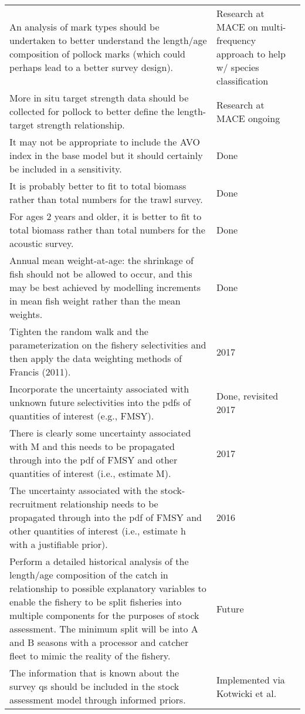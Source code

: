 \documentclass[]{article}
\begin{document}
\begin{table}[ht]
\begin{tabular}{p{4.0in}p{2.5in}}
An analysis of mark types should be undertaken to better understand the length/age composition of pollock marks (which could perhaps lead to a better survey design).   &   Research at MACE on multi-frequency approach to help w/ species classification \\
More in situ target strength data should be collected for pollock to better define the length-target strength relationship. &   Research at MACE ongoing \\
It may not be appropriate to include the AVO index in the base model but it should certainly be included in a sensitivity.  &   Done \\
It is probably better to fit to total biomass rather than total numbers for the trawl survey.   &   Done \\
For ages 2 years and older, it is better to fit to total biomass rather than total numbers for the acoustic survey. &   Done \\
Annual mean weight-at-age: the shrinkage of fish should not be allowed to occur, and this may be best achieved by modelling increments in mean fish weight rather than the mean weights.    &   Done \\
Tighten the random walk and the parameterization on the fishery selectivities and then apply the data weighting methods of Francis (2011).  &   2017 \\
Incorporate the uncertainty associated with unknown future selectivities into the pdfs of quantities of interest (e.g., FMSY).  &   Done, revisited 2017 \\
There is clearly some uncertainty associated with M and this needs to be propagated through into the pdf of FMSY and other quantities of interest (i.e., estimate M).   &   2017 \\
The uncertainty associated with the stock-recruitment relationship needs to be propagated through into the pdf of FMSY and other quantities of interest (i.e., estimate h with a justifiable prior).    &   2016 \\
Perform a detailed historical analysis of the length/age composition of the catch in relationship to possible explanatory variables to enable the fishery to be split fisheries into multiple components for the purposes of stock assessment. The minimum split will be into A and B seasons with a processor and catcher fleet to mimic the reality of the fishery.   &   Future \\
The information that is known about the survey qs should be included in the stock assessment model through informed priors. &   Implemented via Kotwicki et al. \\

\end{tabular}
\end{table}
\end{document}
